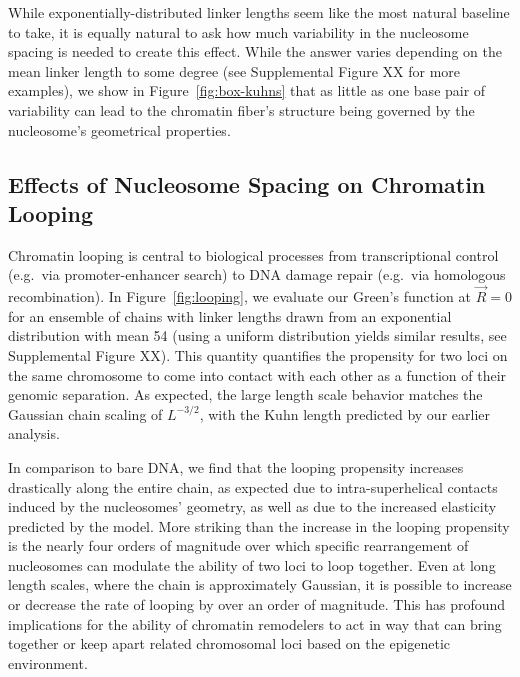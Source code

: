 \documentclass[%
 reprint,
superscriptaddress,
showpacs,preprintnumbers,
 amsmath,amssymb,
 aps,
 prl,
]{revtex4-1}
\begin{document}
While exponentially-distributed linker lengths seem like the most natural
    baseline to take, it is equally natural to ask how much variability in the
    nucleosome spacing is needed to create this effect.
While the answer varies depending on the mean linker length to some degree (see
    Supplemental Figure XX for more examples), we show in
    Figure~\ref{fig:box-kuhns} that as little as one base pair of variability
    can lead to the chromatin fiber's structure being governed by the
    nucleosome's geometrical properties.

\subsection{\label{sec:looping}Effects of Nucleosome Spacing on Chromatin
Looping}

Chromatin looping is central to biological processes from transcriptional
    control (e.g.\ via promoter-enhancer search) to DNA damage repair (e.g.\ via
    homologous recombination).
In Figure~\ref{fig:looping}, we evaluate our Green's function at $\vec{R} = 0$
    for an ensemble of chains with linker lengths drawn from an exponential
    distribution with mean \SI{54}{\basepair} (using a uniform distribution
    yields similar results, see Supplemental Figure XX).
This quantity quantifies the propensity for two loci on the same chromosome to
    come into contact with each other as a function of their genomic separation.
As expected, the large length scale behavior matches the Gaussian chain scaling
    of $L^{-3/2}$, with the Kuhn length predicted by our earlier analysis.

In comparison to bare DNA, we find that the looping propensity increases
    drastically along the entire chain, as expected due to intra-superhelical
    contacts induced by the nucleosomes' geometry, as well as due to the
    increased elasticity predicted by the model.
More striking than the increase in the looping propensity is the nearly four
    orders of magnitude over which specific rearrangement of nucleosomes can
    modulate the ability of two loci to loop together.
Even at long length scales, where the chain is approximately Gaussian, it is
    possible to increase or decrease the rate of looping by over an order of
    magnitude.
This has profound implications for the ability of chromatin remodelers to act in
    way that can bring together or keep apart related chromosomal loci based on
    the epigenetic environment.
\end{document}
